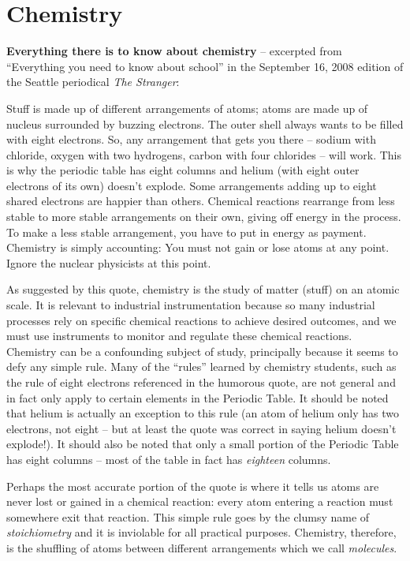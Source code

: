 \chapter{Chemistry}

\noindent
\textbf{Everything there is to know about chemistry} -- excerpted from ``Everything you need to know about school'' in the September 16, 2008 edition of the Seattle periodical \textit{The Stranger}:

\vskip 10pt {\narrower \noindent \baselineskip5pt

Stuff is made up of different arrangements of atoms; atoms are made up of nucleus surrounded by buzzing electrons.  The outer shell always wants to be filled with eight electrons.  So, any arrangement that gets you there -- sodium with chloride, oxygen with two hydrogens, carbon with four chlorides -- will work.  This is why the periodic table has eight columns and helium (with eight outer electrons of its own) doesn't explode.  Some arrangements adding up to eight shared electrons are happier than others.  Chemical reactions rearrange from less stable to more stable arrangements on their own, giving off energy in the process.  To make a less stable arrangement, you have to put in energy as payment.  Chemistry is simply accounting: You must not gain or lose atoms at any point.  Ignore the nuclear physicists at this point.

\par} \vskip 10pt

As suggested by this quote, chemistry is the study of matter (stuff) on an atomic scale.  It is relevant to industrial instrumentation because so many industrial processes rely on specific chemical reactions to achieve desired outcomes, and we must use instruments to monitor and regulate these chemical reactions.  Chemistry can be a confounding subject of study, principally because it seems to defy any simple rule.  Many of the ``rules'' learned by chemistry students, such as the rule of eight electrons referenced in the humorous quote, are not general and in fact only apply to certain elements in the Periodic Table.  It should be noted that helium is actually an exception to this rule (an atom of helium only has two electrons, not eight -- but at least the quote was correct in saying helium doesn't explode!).  It should also be noted that only a small portion of the Periodic Table has eight columns -- most of the table in fact has \textit{eighteen} columns.

Perhaps the most accurate portion of the quote is where it tells us atoms are never lost or gained in a chemical reaction: every atom entering a reaction must somewhere exit that reaction.  This simple rule goes by the clumsy name of \textit{stoichiometry} and it is inviolable for all practical purposes.  Chemistry, therefore, is the shuffling of atoms between different arrangements which we call \textit{molecules}.



